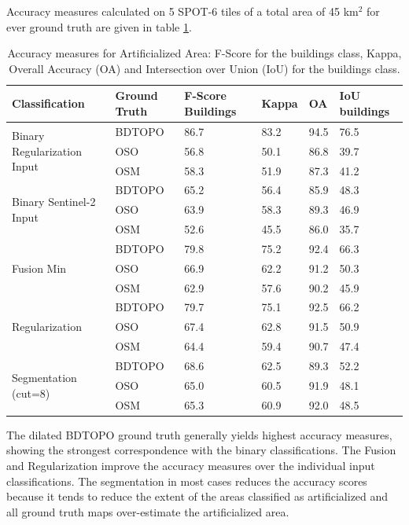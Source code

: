 \documentclass[10pt]{article}
\newcommand{\region}{finistere}
\begin{document}
Accuracy measures calculated on 5 SPOT-6 tiles of a total area of 45 km$^2$ for ever ground truth are given in table \ref{table:accuracy-bin\region}.
\begin{table}[H]
	\centering
	\begin{tabular}{llp{1.5cm}llp{1.5cm}}
		\toprule
		\textbf{Classification} & \textbf{Ground Truth} & \textbf{F-Score Buildings} & \textbf{Kappa} & \textbf{OA} & \textbf{IoU buildings}		\\\hline
		\multirow{3}{*}{Binary Regularization Input}& BDTOPO & 86.7 & 83.2 & 94.5 & 76.5 \\
		& OSO & 56.8 & 50.1 & 86.8 & 39.7 \\
		& OSM & 58.3 & 51.9 & 87.3 & 41.2 \\\hline
		\multirow{3}{*}{Binary Sentinel-2 Input}& BDTOPO & 65.2 & 56.4 & 85.9 & 48.3 \\
		& OSO & 63.9 & 58.3 & 89.3 & 46.9 \\
		& OSM & 52.6 & 45.5 & 86.0 & 35.7 \\\hline
		\multirow{3}{*}{Fusion Min}& BDTOPO & 79.8 & 75.2 & 92.4 & 66.3 \\
		& OSO & 66.9 & 62.2 & 91.2 & 50.3 \\
		& OSM & 62.9 & 57.6 & 90.2 & 45.9 \\\hline
		\multirow{3}{*}{Regularization}& BDTOPO & 79.7 & 75.1 & 92.5 & 66.2 \\
		& OSO & 67.4 & 62.8 & 91.5 & 50.9 \\
		& OSM & 64.4 & 59.4 & 90.7 & 47.4 \\\hline
		\multirow{3}{*}{Segmentation (cut=8)}& BDTOPO & 68.6 & 62.5 & 89.3 & 52.2 \\
		& OSO & 65.0 & 60.5 & 91.9 & 48.1 \\
		& OSM & 65.3 & 60.9 & 92.0 & 48.5 \\
		\bottomrule
	\end{tabular}
	\caption{Accuracy measures for Artificialized Area: F-Score for the buildings class, Kappa, Overall Accuracy (OA) and Intersection over Union (IoU) for the buildings class.}
	\label{table:accuracy-bin\region}
\end{table}
The dilated BDTOPO ground truth generally yields highest accuracy measures, showing the strongest correspondence with the binary classifications. The Fusion and Regularization improve the accuracy measures over the individual input classifications. The segmentation in most cases reduces the accuracy scores because it tends to reduce the extent of the areas classified as artificialized and all ground truth maps over-estimate the artificialized area.
\end{document}
